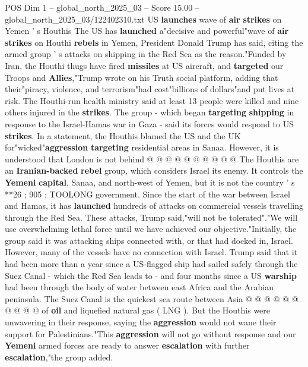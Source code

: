 \begin{textsample}{POS Dim 1 – global\_north\_2025\_03 – Score 15.00 – global\_north\_2025\_03/122402310.txt}  \label{ex:f1_pos_428}
US \textbf{launches} wave of \textbf{air} \textbf{strikes} on Yemen ' s Houthis The US has \textbf{launched} a"decisive and powerful"wave of \textbf{air} \textbf{strikes} on Houthi \textbf{rebels} in Yemen, President Donald Trump has said, citing the armed group ' s attacks on shipping in the Red Sea as the reason."Funded by Iran, the Houthi thugs have fired \textbf{missiles} at US aircraft, and \textbf{targeted} our Troops and \textbf{Allies},"Trump wrote on his Truth social platform, adding that their"piracy, violence, and terrorism"had cost"billions of dollars"and put lives at risk.
The Houthi-run health ministry said at least 13 people were killed and nine others injured in the \textbf{strikes}.
The group - which began \textbf{targeting} \textbf{shipping} in response to the Israel-Hamas war in Gaza - said its forces would respond to US \textbf{strikes}.
In a statement, the Houthis blamed the US and the UK for"wicked"\textbf{aggression} \textbf{targeting} residential areas in Sanaa.
However, it is understood that London is not behind @ @ @ @ @ @ @ @ @ @ The Houthis are an \textbf{Iranian-backed} \textbf{rebel} group, which considers Israel its enemy.
It controls the \textbf{Yemeni} \textbf{capital}, Sanaa, and north-west of Yemen, but it is not the country ' s **26 ; 905 ; TOOLONG government.
Since the start of the war between Israel and Hamas, it has \textbf{launched} hundreds of attacks on commercial vessels travelling through the Red Sea.
These attacks, Trump said,"will not be tolerated"."We will use overwhelming lethal force until we have achieved our objective."Initially, the group said it was attacking ships connected with, or that had docked in, Israel.
However, many of the vessels have no connection with Israel.
Trump said that it had been more than a year since a US-flagged ship had sailed safely through the Suez Canal - which the Red Sea leads to - and four months since a US \textbf{warship} had been through the body of water between east Africa and the Arabian peninsula.
The Suez Canal is the quickest sea route between Asia @ @ @ @ @ @ @ @ @ @ of \textbf{oil} and liquefied natural gas ( LNG ).
But the Houthis were unwavering in their response, saying the \textbf{aggression} would not wane their support for Palestinians."This \textbf{aggression} will not go without response and our \textbf{Yemeni} armed forces are ready to answer \textbf{escalation} with further \textbf{escalation},"the group added.

\end{textsample}
